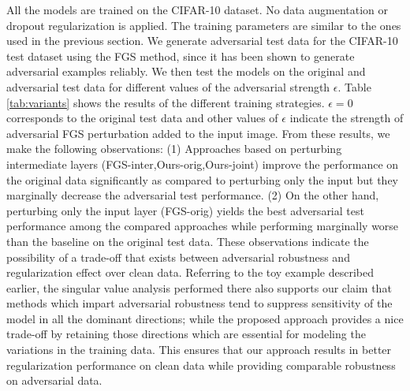 All the models are trained on the CIFAR-10 dataset. No data augmentation or dropout regularization is applied. The training parameters are similar to the ones used in the previous section. We generate adversarial test data for the CIFAR-10 test dataset using the FGS method, since it has been shown to generate adversarial examples reliably. We then test the models on the original and adversarial test data for different values of the adversarial strength $\epsilon$. Table \ref{tab:variants} shows the results of the different training strategies. $\epsilon=0$ corresponds to the original test data and other values of $\epsilon$ indicate the strength of adversarial FGS perturbation added to the input image. From these results, we make the following observations: (1)  Approaches based on perturbing intermediate layers (FGS-inter,Ours-orig,Ours-joint) improve the performance on the original data significantly as compared to perturbing only the input but they marginally decrease the adversarial test performance. (2) On the other hand, perturbing only the input layer (FGS-orig) yields the best adversarial test performance among the compared approaches while performing marginally worse than the baseline on the original test data. These observations indicate the possibility of a trade-off that exists between adversarial robustness and regularization effect over clean data. Referring to the toy example described earlier, the singular value analysis performed there also supports our claim that methods which impart adversarial robustness tend to suppress sensitivity of the model in all the dominant directions; while the proposed approach provides a nice trade-off by retaining those directions which are essential for modeling the variations in the training data. This ensures that our approach results in better regularization performance on clean data while providing comparable robustness on adversarial data.

